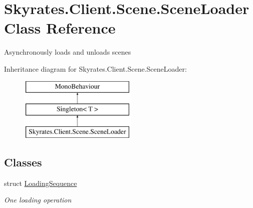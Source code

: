 \hypertarget{class_skyrates_1_1_client_1_1_scene_1_1_scene_loader}{\section{Skyrates.\-Client.\-Scene.\-Scene\-Loader Class Reference}
\label{class_skyrates_1_1_client_1_1_scene_1_1_scene_loader}
}


Asynchronously loads and unloads scenes  


Inheritance diagram for Skyrates.\-Client.\-Scene.\-Scene\-Loader\-:\begin{figure}[H]
\begin{center}
\leavevmode
\includegraphics[height=3.000000cm]{class_skyrates_1_1_client_1_1_scene_1_1_scene_loader}
\end{center}
\end{figure}
\subsection*{Classes}
\begin{DoxyCompactItemize}
\item 
struct \hyperlink{struct_skyrates_1_1_client_1_1_scene_1_1_scene_loader_1_1_loading_sequence}{Loading\-Sequence}
\begin{DoxyCompactList}\small\item\em One loading operation \end{DoxyCompactList}\end{DoxyCompactItemize}
